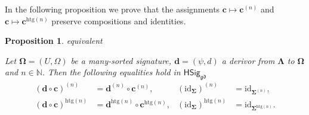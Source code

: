 \documentclass[a4paper, reqno]{amsbook}
\makeatletter
\newcommand{\sig}[1]{\mathbf{#1}}             %
\newcommand{\gd}{\mathfrak{gd}}              %
\newcommand{\htg}{\mathrm{htg}}                %
\newcommand{\id}{\mathrm{id}}
\theoremstyle{plain}
\newtheorem{proposition}[theorem]{Proposition}
\theoremstyle{definition}
\newcommand*{\CA@leanpending}{}
\newcommand*{\CA@leanrelation}{}
\newcommand*{\lean}[2]{%
  \ifcsname\string\color@lean@#1\endcsname\else
    \PackageError{main}{Unknown relation `#1' in \string\lean}{Use equivalent, weaker or stronger.}%
  \fi
  \gdef\CA@leanrelation{#1}%
  \gdef\CA@leanpending{#2}}
\makeatother
\begin{document}
In the following proposition we prove that the assignments $\mathbf{c}\mapsto\mathbf{c}^{(n)}$ and $\mathbf{c}\mapsto\mathbf{c}^{\htg(n)}$ preserve compositions and identities.

\begin{proposition}\label{PChangeSigDerivorComp}\lean{equivalent}{ChangeOfSignature.homogeneous_comp,ChangeOfSignature.homogeneous_identity,ChangeOfSignature.heterogeneous_comp,ChangeOfSignature.heterogeneous_identity}
Let $\sig{\Omega}=(U,\Omega)$ be a many-sorted signature, $\mathbf{d}=(\psi,d)$ a derivor from $\sig{\Lambda}$ to $\sig{\Omega}$ and $n\in\mathbb{N}$.
Then the following equalities hold in $\mathsf{HSig}_{\gd}$
\begin{align*}
(\mathbf{d}\circ\mathbf{c})^{(n)}&=\mathbf{d}^{(n)}\circ\mathbf{c}^{(n)},
&
(\id_{\sig{\Sigma}})^{(n)}&=\id_{\sig{\Sigma}^{(n)}},
\\
(\mathbf{d}\circ\mathbf{c})^{\htg(n)}&=\mathbf{d}^{\htg(n)}\circ\mathbf{c}^{\htg(n)},
&
(\id_{\sig{\Sigma}})^{\htg(n)}&=\id_{\sig{\Sigma}^{\htg(n)}}.
\end{align*}
\end{proposition}
\end{document}
